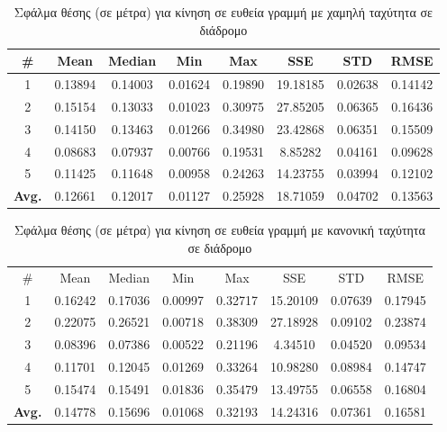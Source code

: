 \begin{table}[H]
    \centering
    \caption{Σφάλμα θέσης (σε μέτρα) για κίνηση σε ευθεία γραμμή με χαμηλή ταχύτητα σε διάδρομο}
    \label{tab:position_error_line_slow_corridor}
    \begin{tabular}{| c | c | c | c | c | c | c | c | }
        \hline
        \rowcolor{Gray}
        \# & Mean & Median & Min & Max & SSE & STD & RMSE \\
        \hline
        1 & 0.13894 & 0.14003 & 0.01624 & 0.19890 & 19.18185 & 0.02638 & 0.14142 \\
        2 & 0.15154 & 0.13033 & 0.01023 & 0.30975 & 27.85205 & 0.06365 & 0.16436 \\
        3 & 0.14150 & 0.13463 & 0.01266 & 0.34980 & 23.42868 & 0.06351 & 0.15509 \\
        4 & 0.08683 & 0.07937 & 0.00766 & 0.19531 & 8.85282 & 0.04161 & 0.09628 \\ 
        5 & 0.11425 & 0.11648 & 0.00958 & 0.24263 & 14.23755 & 0.03994 & 0.12102 \\
        \hline
        \textbf{Avg.} & 0.12661 & 0.12017 & 0.01127 & 0.25928 & 18.71059 & 0.04702 & 0.13563 \\
        \hline
    \end{tabular}
\end{table}

\begin{table}[H]
    \begin{center}
        \centering
        \caption{Σφάλμα θέσης (σε μέτρα) για κίνηση σε ευθεία γραμμή με κανονική ταχύτητα σε διάδρομο}
        \label{tab:position_error_line_normal_corridor}
        \begin{tabular}{| c | c | c | c | c | c | c | c | }
        \hline
        \rowcolor{Gray}
        \# & Mean & Median & Min & Max & SSE & STD & RMSE \\
        1 & 0.16242 & 0.17036 & 0.00997 & 0.32717 & 15.20109 & 0.07639 & 0.17945 \\
        2 & 0.22075 & 0.26521 & 0.00718 & 0.38309 & 27.18928 & 0.09102 & 0.23874 \\
        3 & 0.08396 & 0.07386 & 0.00522 & 0.21196 & 4.34510 & 0.04520 & 0.09534 \\
        4 & 0.11701 & 0.12045 & 0.01269 & 0.33264 & 10.98280 & 0.08984 & 0.14747 \\
        5 & 0.15474 & 0.15491 & 0.01836 & 0.35479 & 13.49755 & 0.06558 & 0.16804 \\
        \hline
        \textbf{Avg.} & 0.14778 & 0.15696 & 0.01068 & 0.32193 & 14.24316 & 0.07361 & 0.16581 \\
        \hline
        \end{tabular}
    \end{center}
\end{table}

